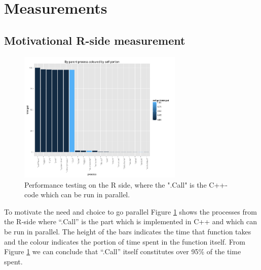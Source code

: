

\section{Measurements}

\subsection{Motivational R-side measurement}

\begin{figure}[!htbp] \centering
  \includegraphics[width=0.7\textwidth]{images/parentColByPortion.pdf}
  \caption{Performance testing on the R side, where the ".Call" is the
C++-code which can be run in parallel.}
  \label{fig:rMot}
\end{figure}

To motivate the need and choice to go parallel Figure \ref{fig:rMot}
shows the processes from the R-side where ``.Call'' is the part which
is implemented in C++ and which can be run in parallel. The height of
the bars indicates the time that function takes and the colour
indicates the portion of time spent in the function itself. From
Figure \ref{fig:rMot} we can conclude that ``.Call'' itself
constitutes over 95\% of the time spent.

